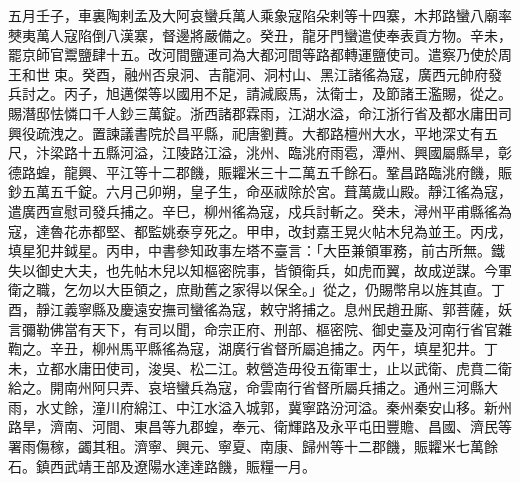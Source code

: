\begin{pinyinscope}
 五月壬子，車裏陶剌孟及大阿哀蠻兵萬人乘象寇陷朵剌等十四寨，木邦路蠻八廟率僰夷萬人寇陷倒八漢寨，督邊將嚴備之。癸丑，龍牙門蠻遣使奉表貢方物。辛未，罷京師官鬻鹽肆十五。改河間鹽運司為大都河間等路都轉運鹽使司。遣察乃使於周王和世束。癸酉，融州否泉洞、吉龍洞、洞村山、黑江諸徭為寇，廣西元帥府發兵討之。丙子，旭邁傑等以國用不足，請減廄馬，汰衛士，及節諸王濫賜，從之。賜潛邸怯憐口千人鈔三萬錠。浙西諸郡霖雨，江湖水溢，命江浙行省及都水庸田司興役疏洩之。置諫議書院於昌平縣，祀唐劉蕡。大都路檀州大水，平地深丈有五尺，汴梁路十五縣河溢，江陵路江溢，洮州、臨洮府雨雹，潭州、興國屬縣旱，彰德路蝗，龍興、平江等十二郡饑，賑糶米三十二萬五千餘石。鞏昌路臨洮府饑，賑鈔五萬五千錠。六月己卯朔，皇子生，命巫祓除於宮。葺萬歲山殿。靜江徭為寇，遣廣西宣慰司發兵捕之。辛巳，柳州徭為寇，戍兵討斬之。癸未，潯州平甫縣徭為寇，達魯花赤都堅、都監姚泰亨死之。甲申，改封嘉王晃火帖木兒為並王。丙戌，填星犯井鉞星。丙申，中書參知政事左塔不臺言：「大臣兼領軍務，前古所無。鐵失以御史大夫，也先帖木兒以知樞密院事，皆領衛兵，如虎而翼，故成逆謀。今軍衛之職，乞勿以大臣領之，庶勛舊之家得以保全。」從之，仍賜幣帛以旌其直。丁酉，靜江義寧縣及慶遠安撫司蠻徭為寇，敕守將捕之。息州民趙丑廝、郭菩薩，妖言彌勒佛當有天下，有司以聞，命宗正府、刑部、樞密院、御史臺及河南行省官雜鞫之。辛丑，柳州馬平縣徭為寇，湖廣行省督所屬追捕之。丙午，填星犯井。丁未，立都水庸田使司，浚吳、松二江。敕營造毋役五衛軍士，止以武衛、虎賁二衛給之。開南州阿只弄、哀培蠻兵為寇，命雲南行省督所屬兵捕之。通州三河縣大雨，水丈餘，潼川府綿江、中江水溢入城郭，冀寧路汾河溢。秦州秦安山移。新州路旱，濟南、河間、東昌等九郡蝗，奉元、衛輝路及永平屯田豐贍、昌國、濟民等署雨傷稼，蠲其租。濟寧、興元、寧夏、南康、歸州等十二郡饑，賑糶米七萬餘石。鎮西武靖王部及遼陽水達達路饑，賑糧一月。




\end{pinyinscope}
